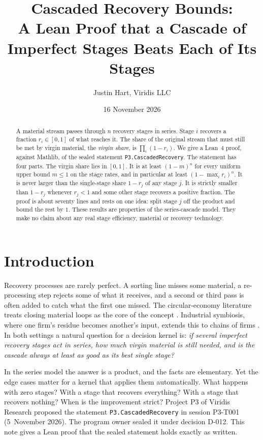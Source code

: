 \documentclass[11pt]{article}
\title{Cascaded Recovery Bounds:\\ A Lean Proof that a Cascade of Imperfect Stages Beats Each of Its Stages}
\author{Justin Hart, Viridis LLC}
\date{16 November 2026}
\theoremstyle{definition}
\theoremstyle{remark}
\begin{document}
\maketitle

\begin{abstract}
A material stream passes through $n$ recovery stages in series. Stage $i$ recovers a fraction
$r_i\in[0,1]$ of what reaches it. The share of the original stream that must still be met by
virgin material, the \emph{virgin share}, is $\prod_i(1-r_i)$. We give a Lean~4 proof, against
Mathlib, of the sealed statement \texttt{P3.CascadedRecovery}. The statement has four parts.
The virgin share lies in $[0,1]$. It is at least $(1-m)^n$ for every uniform upper bound $m\le1$ on
the stage rates, and in particular at least $(1-\max_i r_i)^n$. It is never larger than the
single-stage share $1-r_j$ of any stage $j$. It is strictly smaller than $1-r_j$ whenever
$r_j<1$ and some other stage recovers a positive fraction. The proof is about seventy lines and
rests on one idea: split stage $j$ off the product and bound the rest by $1$. These results are
properties of the series-cascade model. They make no claim about any real stage efficiency,
material or recovery technology.
\end{abstract}

\section{Introduction}
Recovery processes are rarely perfect. A sorting line misses some material, a re-processing step
rejects some of what it receives, and a second or third pass is often added to catch what the
first one missed. The circular-economy literature treats closing material loops as the core of
the concept \citep{geissdoerfer2017}. Industrial symbiosis, where one firm's residue becomes
another's input, extends this to chains of firms \citep{chertow2000}. In both settings a natural
question for a decision kernel is: \emph{if several imperfect recovery stages act in series, how
much virgin material is still needed, and is the cascade always at least as good as its best
single stage?}

In the series model the answer is a product, and the facts are elementary. Yet the edge cases
matter for a kernel that applies them automatically. What happens with zero stages? With a stage
that recovers everything? With a stage that recovers nothing? When is the improvement strict?
Project P3 of Viridis Research proposed the statement \texttt{P3.CascadedRecovery} in session
P3-T001 (5~November 2026). The program owner sealed it under decision D-012. This note gives a
Lean proof that the sealed statement holds exactly as written.
\end{document}
